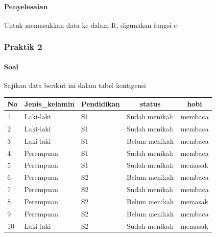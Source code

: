 \documentclass[a4paper,12pt]{article}
\begin{document}
\paragraph{Penyelesaian\\}
Untuk memasukkan data ke dalam R, digunakan fungsi c 
\subsubsection{Praktik 2}
\paragraph{Soal\\}
Sajikan data berikut ini dalam tabel kontigensi
\begin{table}[!ht]
	\begin{tabular}{|l|l|l|l|l|}
		\hline
		No & Jenis\_kelamin & \multicolumn{1}{c|}{Pendidikan} & \multicolumn{1}{c|}{status} & \multicolumn{1}{c|}{hobi} \\ \hline
		1  & Laki-laki      & S1                              & Sudah menikah               & membaca                   \\ \hline
		2  & Laki-laki      & S1                              & Sudah menikah               & membaca                   \\ \hline
		3  & Laki-laki      & S1                              & Belum menikah               & membaca                   \\ \hline
		4  & Perempuan      & S1                              & Sudah menikah               & membaca                   \\ \hline
		5  & Perempuan      & S1                              & Sudah menikah               & memasak                   \\ \hline
		6  & Perempuan      & S2                              & Belum menikah               & membaca                   \\ \hline
		7  & Perempuan      & S2                              & Sudah menikah               & membaca                   \\ \hline
		8  & Perempuan      & S2                              & Belum menikah               & memasak                   \\ \hline
		9  & Perempuan      & S2                              & Belum menikah               & membaca                   \\ \hline
		10 & Laki-laki      & S2                              & Sudah menikah               & memasak                   \\ \hline
	\end{tabular}
\end{table}
\end{document}
